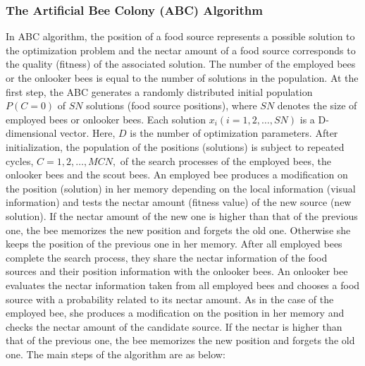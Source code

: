 \documentclass[pdftex,11pt]{article}
\begin{document}
\subsubsection{The Artificial Bee Colony (ABC) Algorithm}
In ABC algorithm, the position of a food source represents a possible solution to the optimization problem and the nectar amount of a food source corresponds to the quality (fitness) of the associated solution. The number of the employed bees or the onlooker bees is equal to the number of solutions in the population. At the first step, the ABC generates a randomly distributed initial population $P(C = 0)$  of $SN$ solutions (food source positions), where $SN$ denotes the size of employed bees or onlooker bees. Each solution $x_i (i = 1, 2,\dots,SN)$  is a D-dimensional vector. Here, $D$ is the number of optimization parameters. After initialization, the population of the positions (solutions) is subject to repeated cycles, $C = 1, 2, \dots, MCN,$ of the search processes of the employed bees, the onlooker bees and the scout bees. An employed bee produces a modification on the position (solution) in her memory depending on the local information (visual information) and tests the nectar amount (fitness value) of the new source (new solution). If the nectar amount of the new one is higher than that of the previous one, the bee memorizes the new position and forgets the old one. Otherwise she keeps the position of the previous one in her memory. After all employed bees complete the search process, they share the nectar information of the food sources and their position information with the onlooker bees. An onlooker bee evaluates the nectar information taken from all employed bees and chooses a food source with a probability related to its nectar amount. As in the case of the employed bee, she produces a modification on the position in her memory and checks the nectar amount of the candidate source. If the nectar is higher than that of the previous one, the bee memorizes the new position and forgets the old one. The main steps of the algorithm are as below:
\end{document}
